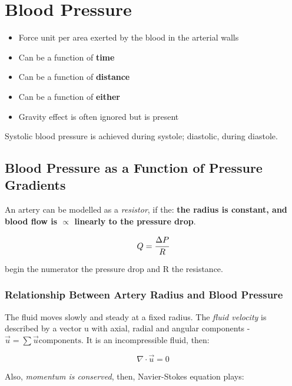 




\section{Blood Pressure}

\begin{itemize}
    \item Force unit per area exerted by the blood in the arterial walls
    \item Can be a function of \textbf{time}
    \item Can be a function of \textbf{distance}
    \item Can be a function of \textbf{either}
    \item Gravity effect is often ignored but is present
\end{itemize}

Systolic blood pressure is achieved during systole; diastolic, during diastole. 

\subsection{Blood Pressure as a Function of Pressure Gradients}

An artery can be modelled as a \emph{resistor}, if the: \textbf{the radius is constant, and blood flow is $\varpropto$ linearly to the pressure drop}. 

\begin{equation}
    Q = \cfrac{\Delta P}{R}
\end{equation}

begin the numerator the pressure drop and R the resistance. 

\subsubsection{Relationship Between Artery Radius and Blood Pressure}

The fluid moves slowly and steady at a fixed radius. The \emph{fluid velocity} is described by a vector u with axial, radial and angular components - $\vec{u} = \sum \vec{u} \text{components}$. It is an incompressible fluid, then:

\begin{equation}
    \nabla \cdot \vec{u} = 0
\end{equation}

Also, \emph{momentum is conserved}, then, Navier-Stokes equation plays:


